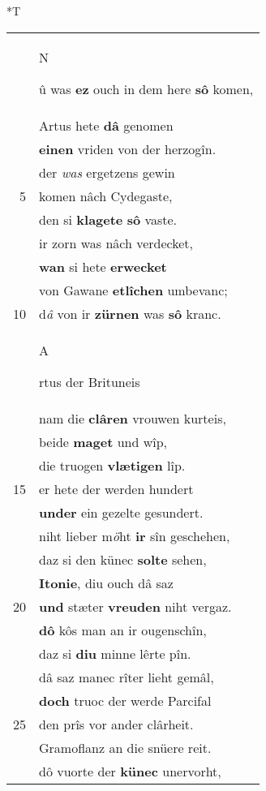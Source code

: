 \documentclass[8pt,a4paper,notitlepage]{article}
\begin{document}
\begin{table}[ht]
\begin{minipage}[t]{0.5\linewidth}
\small
\begin{center}*T
\end{center}
\begin{tabular}{rl}
 & \begin{large}N\end{large}û was \textbf{ez} ouch in dem here \textbf{sô} komen,\\ 
 & Artus hete \textbf{dâ} genomen\\ 
 & \textbf{einen} vriden von der herzogîn.\\ 
 & der \textit{was} ergetzens gewin\\ 
5 & komen nâch Cydegaste,\\ 
 & den si \textbf{klagete} \textbf{sô} vaste.\\ 
 & ir zorn was nâch verdecket,\\ 
 & \textbf{wan} si hete \textbf{erwecket}\\ 
 & von Gawane \textbf{etlîchen} umbevanc;\\ 
10 & d\textit{â} von ir \textbf{zürnen} was \textbf{sô} kranc.\\ 
 & \begin{large}A\end{large}rtus der Brituneis\\ 
 & nam die \textbf{clâren} vrouwen kurteis,\\ 
 & beide \textbf{maget} und wîp,\\ 
 & die truogen \textbf{vlætigen} lîp.\\ 
15 & er hete der werden hundert\\ 
 & \textbf{under} ein gezelte gesundert.\\ 
 & niht lieber m\textit{ö}ht \textbf{ir} sîn geschehen,\\ 
 & daz si den künec \textbf{solte} sehen,\\ 
 & \textbf{Itonie}, diu ouch dâ saz\\ 
20 & \textbf{und} stæter \textbf{vreuden} niht vergaz.\\ 
 & \textbf{dô} kôs man an ir ougenschîn,\\ 
 & daz si \textbf{diu} minne lêrte pîn.\\ 
 & dâ saz manec rîter lieht gemâl,\\ 
 & \textbf{doch} truoc der werde Parcifal\\ 
25 & den prîs vor ander clârheit.\\ 
 & Gramoflanz an die snüere reit.\\ 
 & dô vuorte der \textbf{künec} unervorht,\\ 

\end{tabular}
\end{minipage}
\end{table}
\end{document}
